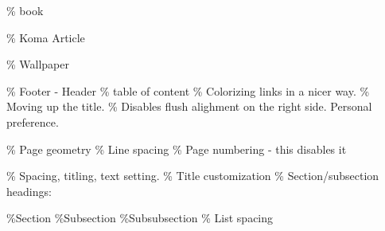 \documentclass[11pt,twoside=false]{article}
\author{AUTHOOOR}
\date{\today}
\title{}
\begin{document}
\tableofcontents

\% book

\% Koma Article

\% Wallpaper

\% Footer - Header
\% table of content
\% Colorizing links in a nicer way.
\% Moving up the title.
\% Disables flush alighment on the right side. Personal preference.

\% Page geometry
\% Line spacing
\% Page numbering - this disables it

\% Spacing, titling, text setting.
\% Title customization
\% Section/subsection headings:

\%Section
\%Subsection
\%Subsubsection
\% List spacing
\end{document}
